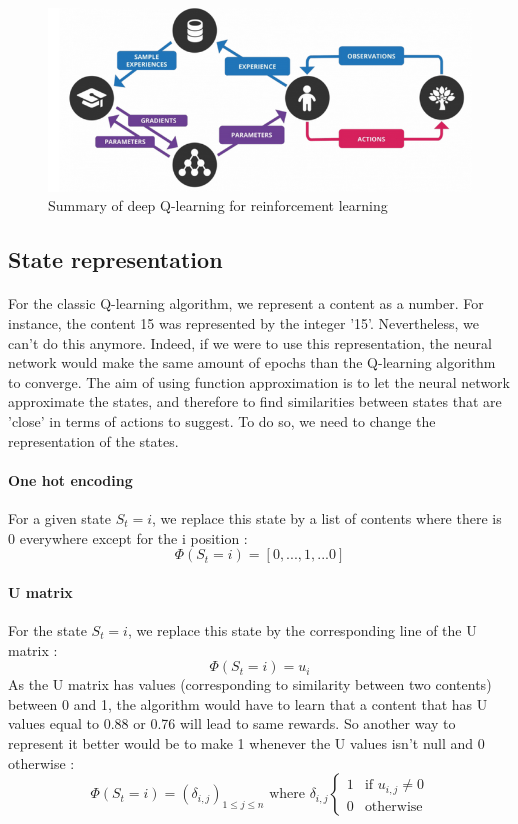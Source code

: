 \documentclass[a4paper]{article}
\begin{document}
\begin{figure}[h!]
    \centering
    \includegraphics[scale = 0.5]{img/schema-dq.png}
    \caption{Summary of deep Q-learning for reinforcement learning}
    \label{fig:my_label}
\end{figure}


\subsection{State representation}

\paragraph{} For the classic Q-learning algorithm, we represent a content as a number. For instance, the content 15 was represented by the integer '15'. Nevertheless, we can't do this anymore. Indeed, if we were to use this representation, the neural network would make the same amount of epochs than the Q-learning algorithm to converge. The aim of using function approximation is to let the neural network approximate the states, and therefore to find similarities between states that are 'close' in terms of actions to suggest. To do so, we need to change the representation of the states. 

\paragraph{One hot encoding }
For a given state $S_t = i$, we replace this state by a list of contents where there is 0 everywhere except for the i position :
\[\Phi(S_t = i ) = [ 0, ... , 1, ... 0         ]   \]

\paragraph{U matrix }
For the state $S_t = i$, we replace this state by the corresponding line of the U matrix : 
\[   \Phi(S_t = i ) = u_i  \]
As the U matrix has values (corresponding to similarity between two contents) between 0 and 1, the algorithm would have to learn that a content that has U values equal to 0.88 or 0.76 will lead to same rewards. So another way to represent it better would be to make 1 whenever the U values isn't null and 0 otherwise : 
\[ \Phi(S_t = i ) = (\delta_{i,j})_{1 \le j \le n  } \text{ where } \delta_{i,j}
\begin{cases}
    1& \text{if } u_{i,j} \ne 0   \\
    0             & \text{otherwise}
\end{cases} \] 
\end{document}
